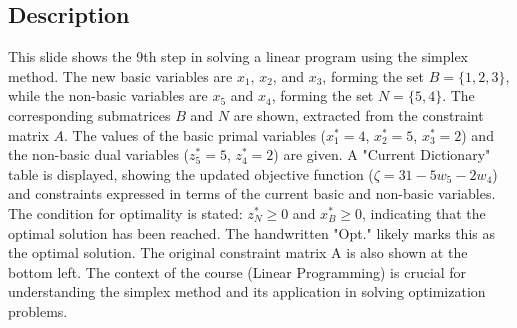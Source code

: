 \documentclass{article}%
\begin{document}
\subsection{Description}%
This slide shows the 9th step in solving a linear program using the simplex method.  The new basic variables are $x_1$, $x_2$, and $x_3$, forming the set $B = \{1, 2, 3\}$, while the non-basic variables are $x_5$ and $x_4$, forming the set $N = \{5, 4\}$. The corresponding submatrices $B$ and $N$ are shown, extracted from the constraint matrix $A$. The values of the basic primal variables ($x_1^* = 4$, $x_2^* = 5$, $x_3^* = 2$) and the non-basic dual variables ($z_5^* = 5$, $z_4^* = 2$) are given. A "Current Dictionary" table is displayed, showing the updated objective function ($\zeta = 31 - 5w_5 - 2w_4$) and constraints expressed in terms of the current basic and non-basic variables. The condition for optimality is stated: $z_N^* \ge 0$ and $x_B^* \ge 0$, indicating that the optimal solution has been reached. The handwritten "Opt." likely marks this as the optimal solution. The original constraint matrix A is also shown at the bottom left.  The context of the course (Linear Programming) is crucial for understanding the simplex method and its application in solving optimization problems.%
\end{document}

